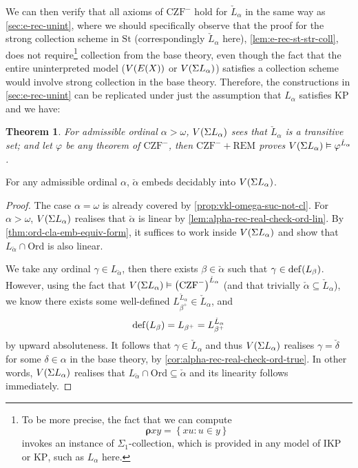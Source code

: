 \documentclass[12pt,openany]{book}
\theoremstyle{plain}
\newtheorem{theorem}{Theorem}[section]
\theoremstyle{definition}
\DeclareMathOperator\dd{def}
\newcommand\KP{\mathrm{KP}}
\newcommand\CZF{\mathrm{CZF}}
\newcommand\REM{\mathrm{REM}}
\newcommand\IKP{\mathrm{IKP}}
\newcommand\Ord{\mathrm{Ord}}
\newcommand\St{\mathrm{St}}
\begin{document}
We can then verify that all axioms of $\CZF^-$ hold for $\check{L}_\alpha$ in the same way as \autoref{sec:e-rec-unint}, where we should specifically observe that the proof for the strong collection scheme in $\St$ (correspondingly $\check{L}_\alpha$ here), \autoref{lem:e-rec-st-str-coll}, does not require\footnote{To be more precise, the fact that we can compute
  \[\bm{\rho} xy = \left\{xu : u \in y\right\}\]
  invokes an instance of $\Sigma_1$-collection, which is provided in any model of $\IKP$ or $\KP$, such as $L_\alpha$ here.} collection from the base theory, even though the fact that the entire uninterpreted model ($V\mleft(E\mleft(X\mright)\mright)$ or $V\mleft(\Sigma L_\alpha\mright)$) satisfies a collection scheme would involve strong collection in the base theory. Therefore, the constructions in \autoref{sec:e-rec-unint} can be replicated under just the assumption that $L_\alpha$ satisfies $\KP$ and we have:
\begin{theorem}
  \label{thm:alpha-rec-real-l-alpha-czf}
  For admissible ordinal $\alpha > \omega$, $V\mleft(\Sigma L_\alpha\mright)$ sees that $\check{L}_\alpha$ is a transitive set; and let $\varphi$ be any theorem of $\CZF^-$, then $\CZF^- + \REM$ proves $V\mleft(\Sigma L_\alpha\mright) \vDash \varphi^{\check{L}_\alpha}$.
\end{theorem}

\begin{corollary}[$\CZF^- + \REM$]
  For any admissible ordinal $\alpha$, $\check{\alpha}$ embeds decidably into $V\mleft(\Sigma L_\alpha\mright)$.
\end{corollary}

\begin{proof}
  The case $\alpha = \omega$ is already covered by \autoref{prop:vkl-omega-suc-not-cl}. For $\alpha > \omega$, $V\mleft(\Sigma L_\alpha\mright)$ realises that $\check{\alpha}$ is linear by \autoref{lem:alpha-rec-real-check-ord-lin}. By \autoref{thm:ord-cla-emb-equiv-form}, it suffices to work inside $V\mleft(\Sigma L_\alpha\mright)$ and show that $L_{\check{\alpha}} \cap \Ord$ is also linear.

  We take any ordinal $\gamma \in L_{\check{\alpha}}$, then there exists $\beta \in \check{\alpha}$ such that $\gamma \in \dd\mleft(L_\beta\mright)$. However, using the fact that $V\mleft(\Sigma L_\alpha\mright) \vDash \left(\CZF^-\right)^{\check{L}_\alpha}$ (and that trivially $\check{\alpha} \subseteq \check{L}_\alpha$), we know there exists some well-defined $L_{\beta^+}^{\check{L}_\alpha} \in \check{L}_\alpha$, and
  \[\dd\mleft(L_\beta\mright) = L_{\beta^+} = L_{\beta^+}^{\check{L}_\alpha}\]
  by upward absoluteness. It follows that $\gamma \in \check{L}_\alpha$ and thus $V\mleft(\Sigma L_\alpha\mright)$ realises $\gamma = \check{\delta}$ for some $\delta \in \alpha$ in the base theory, by \autoref{cor:alpha-rec-real-check-ord-true}. In other words, $V\mleft(\Sigma L_\alpha\mright)$ realises that $L_{\check{\alpha}} \cap \Ord \subseteq \check{\alpha}$ and its linearity follows immediately.
\end{proof}
\end{document}
